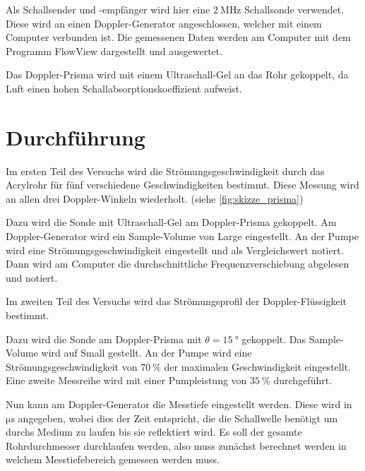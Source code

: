 Als Schallsender und -empfänger wird hier eine $\SI{2}{\mega\hertz}$ Schallsonde verwendet.
Diese wird an einen Doppler-Generator angeschlossen, welcher mit einem Computer verbunden ist.
Die gemessenen Daten werden am Computer mit dem Programm FlowView dargestellt und ausgewertet.

Das Doppler-Prisma wird mit einem Ultraschall-Gel an das Rohr gekoppelt, da Luft einen hohen Schallabsorptionskoeffizient aufweist.


\section{Durchführung}
\label{sec:Durchführung}

Im ersten Teil des Versuchs wird die Strömungsgeschwindigkeit durch das Acrylrohr für fünf verschiedene Geschwindigkeiten bestimmt. 
Diese Messung wird an allen drei Doppler-Winkeln wiederholt. (siehe \autoref{fig:skizze_prisma})

Dazu wird die Sonde mit Ultraschall-Gel am Doppler-Prisma gekoppelt.
Am Doppler-Generator wird ein Sample-Volume von Large eingestellt.
An der Pumpe wird eine Strömungsgeschwindigkeit eingestellt und als Vergleichswert notiert.
Dann wird am Computer die durchschnittliche Frequenzverschiebung abgelesen und notiert.

Im zweiten Teil des Versuchs wird das Strömungsprofil der Doppler-Flüssigkeit bestimmt.

Dazu wird die Sonde am Doppler-Prisma mit $\theta=\SI{15}{\degree}$ gekoppelt.
Das Sample-Volume wird auf Small gestellt.
An der Pumpe wird eine Strömungsgeschwindigkeit von $\SI{70}{\percent}$ der maximalen Geschwindigkeit eingestellt.
Eine zweite Messreihe wird mit einer Pumpleistung von $\SI{35}{\percent}$ durchgeführt.

Nun kann am Doppler-Generator die Messtiefe eingestellt werden.
Diese wird in $\si{\micro\second}$ angegeben, wobei dies der Zeit entspricht, die die Schallwelle benötigt um durchs Medium zu laufen bis sie reflektiert wird.
Es soll der gesamte Rohrdurchmesser durchlaufen werden, also muss zunächst berechnet werden in welchem Messtiefebereich gemessen werden muss.

